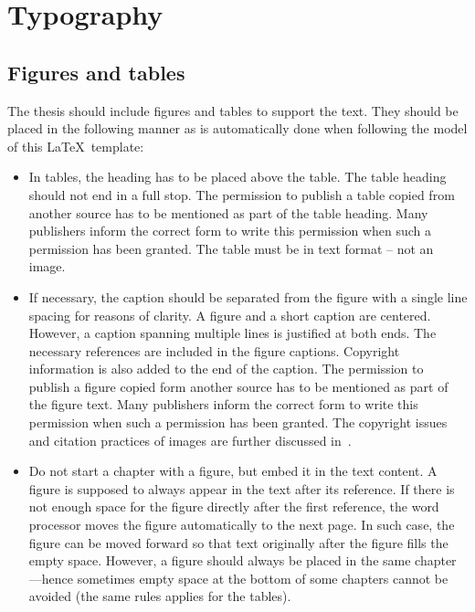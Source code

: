 \section{Typography}
\subsection{Figures and tables}
The thesis should include figures and tables to support the text. They should be placed in the following manner as is automatically done when following the model of this \LaTeX\ template:

\begin{itemize}
    \setlength\itemsep{0pt}
    \setlength\parskip{0pt}
    \item In tables, the heading has to be placed above the table. The
      table heading should not end in a full stop. The permission to
      publish a table copied from another source has to be mentioned
      as part of the table heading. Many publishers inform the correct
      form to write this permission when such a permission has been
      granted. The table must be in text format – not an image.
    \item If necessary, the caption should be separated from the
      figure with a single line spacing for reasons of clarity. A
      figure and a short caption are centered. However, a caption
      spanning multiple lines is justified at both ends. The necessary
      references are included in the figure captions. Copyright
      information is also added to the end of the caption. The
      permission to publish a figure copied form another source has to
      be mentioned as part of the figure text. Many publishers inform
      the correct form to write this permission when such a permission
      has been granted.  The copyright issues and citation practices
      of images are further discussed in~.
    \item Do not start a chapter with a figure, but embed it in the
      text content. A figure is supposed to always appear in the text
      after its reference. If there is not enough space for the figure
      directly after the first reference, the word processor moves the
      figure automatically to the next page. In such case, the figure
      can be moved forward so that text originally after the figure
      fills the empty space. However, a figure should always be placed
      in the same chapter---hence sometimes empty space at the bottom
      of some chapters cannot be avoided (the same rules applies for
      the tables).
\end{itemize}

